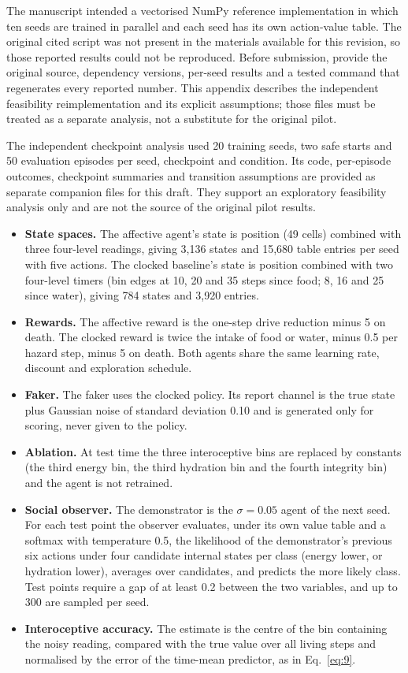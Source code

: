 \documentclass[twoside,11pt]{article}
\begin{document}
The manuscript intended a vectorised NumPy reference implementation in which ten seeds are trained in parallel and each seed has its own action-value table. The original cited script was not present in the materials available for this revision, so those reported results could not be reproduced. Before submission, provide the original source, dependency versions, per-seed results and a tested command that regenerates every reported number. This appendix describes the independent feasibility reimplementation and its explicit assumptions; those files must be treated as a separate analysis, not a substitute for the original pilot.

The independent checkpoint analysis used 20 training seeds, two safe starts and 50 evaluation episodes per seed, checkpoint and condition. Its code, per-episode outcomes, checkpoint summaries and transition assumptions are provided as separate companion files for this draft. They support an exploratory feasibility analysis only and are not the source of the original pilot results.

\begin{itemize}
\item
  \textbf{State spaces.} The affective agent's state is position (49 cells) combined with three four-level readings, giving 3,136 states and 15,680 table entries per seed with five actions. The clocked baseline's state is position combined with two four-level timers (bin edges at 10, 20 and 35 steps since food; 8, 16 and 25 since water), giving 784 states and 3,920 entries.
\item
  \textbf{Rewards.} The affective reward is the one-step drive reduction minus 5 on death. The clocked reward is twice the intake of food or water, minus 0.5 per hazard step, minus 5 on death. Both agents share the same learning rate, discount and exploration schedule.
\item
  \textbf{Faker.} The faker uses the clocked policy. Its report channel is the true state plus Gaussian noise of standard deviation 0.10 and is generated only for scoring, never given to the policy.
\item
  \textbf{Ablation.} At test time the three interoceptive bins are replaced by constants (the third energy bin, the third hydration bin and the fourth integrity bin) and the agent is not retrained.
\item
  \textbf{Social observer.} The demonstrator is the $\sigma = 0.05$ agent of the next seed. For each test point the observer evaluates, under its own value table and a softmax with temperature 0.5, the likelihood of the demonstrator's previous six actions under four candidate internal states per class (energy lower, or hydration lower), averages over candidates, and predicts the more likely class. Test points require a gap of at least 0.2 between the two variables, and up to 300 are sampled per seed.
\item
  \textbf{Interoceptive accuracy.} The estimate is the centre of the bin containing the noisy reading, compared with the true value over all living steps and normalised by the error of the time-mean predictor, as in Eq.~\eqref{eq:9}.
\end{itemize}
\vskip 0.2in


\end{document}
